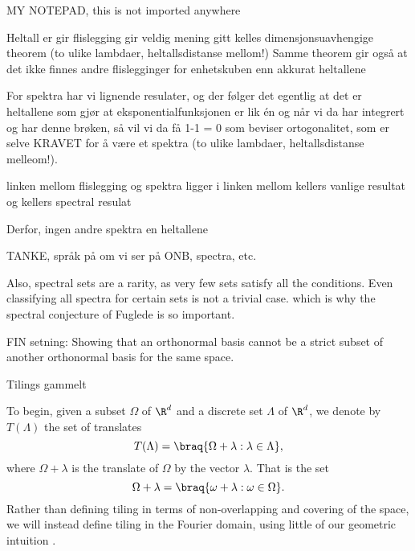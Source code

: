 

MY NOTEPAD, this is not imported anywhere

Heltall er gir flislegging gir veldig mening gitt kelles dimensjonsuavhengige theorem (to ulike lambdaer, heltallsdistanse mellom!)
Samme theorem gir også at det ikke finnes andre flislegginger for enhetskuben enn akkurat heltallene

For spektra har vi lignende resulater, og der følger det egentlig at det er heltallene som gjør at eksponentialfunksjonen er lik én
og når vi da har integrert og har denne brøken, så vil vi da få 1-1 = 0 som beviser ortogonalitet, som er selve KRAVET for å være et spektra
(to ulike lambdaer, heltallsdistanse melleom!). 


linken mellom flislegging og spektra ligger i linken mellom kellers vanlige resultat og kellers spectral resulat

Derfor, ingen andre spektra en heltallene

TANKE, språk på om vi ser på ONB, spectra, etc.

Also, spectral sets are a rarity, as very few sets satisfy all the conditions. 
Even classifying all spectra for certain sets is not a trivial case. which is why the spectral conjecture of Fuglede is so important. 


FIN setning: Showing that an orthonormal basis cannot be a strict subset of another orthonormal basis for the same space. 


Tilings gammelt

To begin, given a subset $\Omega$ of $\R^d$ and a discrete set $\Lambda$ of $\R^d$, we denote by $T(\Lambda)$ the set of translates 
\begin{equation*}
    T(\Lambda) = \braq{\Omega+\lambda : \lambda\in \Lambda},
\end{equation*}
where $\Omega + \lambda$ is the translate of $\Omega$ by the vector $\lambda$. That is the set
\begin{equation*}
    \Omega + \lambda = \braq{\omega + \lambda : \omega \in \Omega}.
\end{equation*}
Rather than defining tiling in terms of non-overlapping and covering of the space, we will instead define tiling in the Fourier domain, using little of our geometric intuition \cite{kolountzakisTilingsTranslation2010} \cite{kolountzakisStudyTranslationalTiling2003}. 


